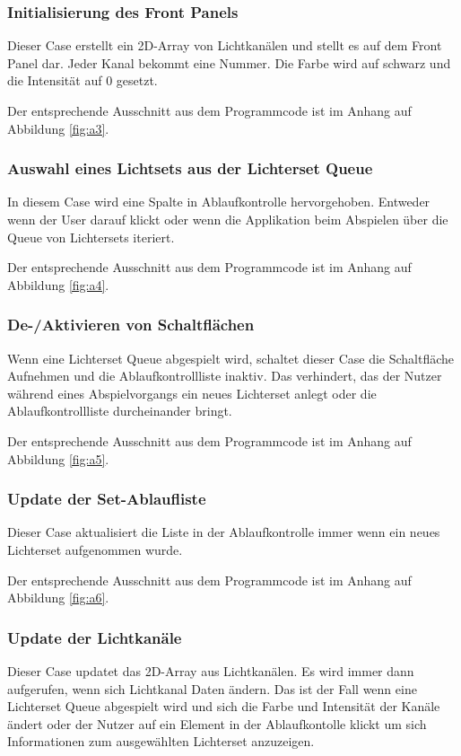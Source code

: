 
\subsubsection{Initialisierung des Front Panels}
Dieser Case erstellt ein 2D-Array von Lichtkanälen und stellt es auf dem Front Panel dar. Jeder Kanal bekommt eine Nummer. Die Farbe wird auf schwarz und die Intensität auf 0 gesetzt. 

Der entsprechende Ausschnitt aus dem Programmcode ist im Anhang auf Abbildung \ref{fig:a3}.

\subsubsection{Auswahl eines Lichtsets aus der Lichterset Queue}
In diesem Case wird eine Spalte in Ablaufkontrolle hervorgehoben. Entweder wenn der User darauf klickt oder wenn die Applikation beim Abspielen über die Queue von Lichtersets iteriert. 

Der entsprechende Ausschnitt aus dem Programmcode ist im Anhang auf Abbildung \ref{fig:a4}.
 
\subsubsection{De-/Aktivieren von Schaltflächen}
Wenn eine Lichterset Queue abgespielt wird, schaltet dieser Case die Schaltfläche Aufnehmen und die Ablaufkontrollliste inaktiv. Das verhindert, das der Nutzer während eines Abspielvorgangs ein neues Lichterset anlegt oder die Ablaufkontrollliste durcheinander bringt.

Der entsprechende Ausschnitt aus dem Programmcode ist im Anhang auf Abbildung \ref{fig:a5}.

\subsubsection{Update der Set-Ablaufliste}
Dieser Case aktualisiert die Liste in der Ablaufkontrolle immer wenn ein neues Lichterset aufgenommen wurde.

Der entsprechende Ausschnitt aus dem Programmcode ist im Anhang auf Abbildung \ref{fig:a6}.

\subsubsection{Update der Lichtkanäle}
Dieser Case updatet das 2D-Array aus Lichtkanälen. Es wird immer dann aufgerufen, wenn sich Lichtkanal Daten ändern. Das ist der Fall wenn eine Lichterset Queue abgespielt wird und sich die Farbe und Intensität der Kanäle ändert oder der Nutzer auf ein Element in der Ablaufkontolle klickt um sich Informationen zum ausgewählten Lichterset anzuzeigen.

